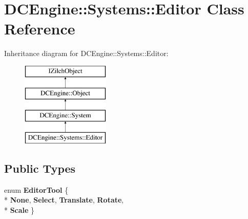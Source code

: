 \hypertarget{classDCEngine_1_1Systems_1_1Editor}{\section{D\-C\-Engine\-:\-:Systems\-:\-:Editor Class Reference}
\label{classDCEngine_1_1Systems_1_1Editor}
}
Inheritance diagram for D\-C\-Engine\-:\-:Systems\-:\-:Editor\-:\begin{figure}[H]
\begin{center}
\leavevmode
\includegraphics[height=4.000000cm]{classDCEngine_1_1Systems_1_1Editor}
\end{center}
\end{figure}
\subsection*{Public Types}
\begin{DoxyCompactItemize}
\item 
enum {\bfseries Editor\-Tool} \{ \\*
{\bfseries None}, 
{\bfseries Select}, 
{\bfseries Translate}, 
{\bfseries Rotate}, 
\\*
{\bfseries Scale}
 \}
\end{DoxyCompactItemize}

